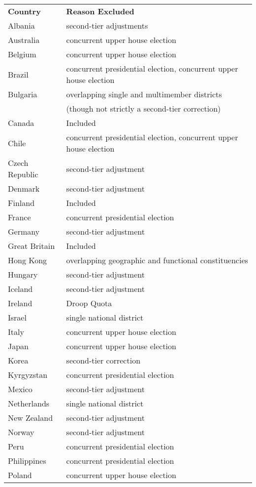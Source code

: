 \documentclass[12pt]{article}
\begin{document}
\begin{appendix}
\begin{table}[H]
{\scriptsize \begin{tabular}{ll}
\textbf{Country} & \textbf{Reason Excluded}\\
Albania & second-tier adjustments\\
Australia & concurrent upper house election \\
Belgium & concurrent upper house election\\
Brazil & concurrent presidential election, concurrent upper house election\\
Bulgaria & overlapping single and multimember districts \\
&(though not strictly a second-tier correction)\\
Canada & Included\\
Chile & concurrent presidential election, concurrent upper house election\\
Czech Republic & second-tier adjustment\\
Denmark & second-tier adjustment\\
Finland & Included\\
France & concurrent presidential election\\
Germany & second-tier adjustment\\
Great Britain & Included\\
Hong Kong & overlapping geographic and functional constituencies\\
Hungary & second-tier adjustment\\
Iceland & second-tier adjustment\\
Ireland & Droop Quota\\
Israel & single national district\\
Italy & concurrent upper house election\\
Japan & concurrent upper house election\\
Korea & second-tier correction\\
Kyrgyzstan & concurrent presidential election\\
Mexico & second-tier adjustment\\
Netherlands & single national district\\
New Zealand&second-tier adjustment\\
Norway&second-tier adjustment\\
Peru&concurrent presidential election\\
Philippines&concurrent presidential election\\
Poland&concurrent upper house election\\

\end{tabular}}
\end{table}
\end{appendix}
\end{document}
